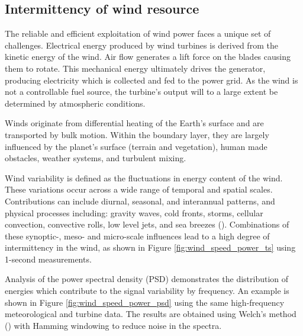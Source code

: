 \clearpage
\subsection{Intermittency of wind resource}
\label{sec:intro_intermittency}

The reliable and efficient exploitation of wind power faces a unique set of challenges. Electrical energy produced by wind turbines is derived from the kinetic energy of the wind. Air flow generates a lift force on the blades causing them to rotate. This mechanical energy ultimately drives the generator, producing electricity which is collected and fed to the power grid. As the wind is not a controllable fuel source, the turbine's output will to a large extent be determined by atmospheric conditions.

Winds originate from differential heating of the Earth's surface and are transported by bulk motion. Within the boundary layer, they are largely influenced by the planet's surface (terrain and vegetation), human made obstacles, weather systems, and turbulent mixing.

Wind variability is defined as the fluctuations in energy content of the wind. These variations occur across a wide range of temporal and spatial scales. Contributions can include diurnal, seasonal, and interannual patterns, and physical processes including: gravity waves, cold fronts, storms, cellular convection, convective rolls, low level jets, and sea breezes (\cite{vincent_forecasting_2017}). Combinations of these synoptic-, meso- and micro-scale influences lead to a high degree of intermittency in the wind, as shown in Figure \ref{fig:wind_speed_power_ts} using 1-second measurements.

Analysis of the power spectral density (PSD) demonstrates the distribution of energies which contribute to the signal variability by frequency. An example is shown in Figure \ref{fig:wind_speed_power_psd} using the same high-frequency meteorological and turbine data. The results are obtained using Welch's method (\cite{welch_use_1967}) with Hamming windowing to reduce noise in the spectra.


